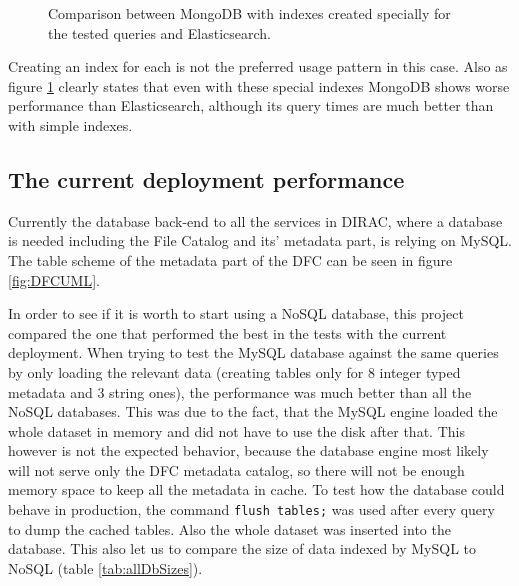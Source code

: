 \begin{figure}[h]
	\centering
	
	\caption{Comparison between MongoDB with indexes created specially for the tested queries and Elasticsearch.}
	\label{fig:MDBcompound}
\end{figure}

Creating an index for each is not the preferred usage pattern in this case. Also as figure \ref{fig:MDBcompound} 
clearly states that even with these special indexes MongoDB shows worse performance than Elasticsearch, although 
its query times are much better than with simple indexes. 

\subsection{The current deployment performance}

Currently the database back-end to all the services in DIRAC, where a database is needed including the File Catalog
and its' metadata part, is relying on MySQL. The table scheme of the metadata part of the DFC can be seen in figure
\ref{fig:DFCUML}.


In order to see if it is worth to start using a NoSQL database, this project compared the one that performed 
the best in the tests with the current deployment. When trying to test the MySQL database against the same queries 
by only loading the relevant data (creating tables only for 8 integer typed metadata and 3 string ones), the 
performance was much better than all the NoSQL databases. This was due to the fact, that the MySQL engine loaded
the whole dataset in memory and did not have to use the disk after that. This however is not the expected 
behavior, because the database engine most likely will not serve only the DFC metadata catalog, so there will not
be enough memory space to keep all the metadata in cache. To test how the database could behave in production, the 
command \texttt{flush tables;} was used after every query to dump the cached tables. Also the whole dataset
was inserted into the database. This also let us to compare the size of data indexed by MySQL to NoSQL (table 
\ref{tab:allDbSizes}). 

